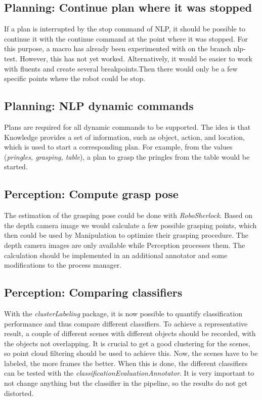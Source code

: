 \documentclass[main.tex]{subfiles}
\begin{document}
		\vspace{0.4cm}
		
		\subsection{Planning: Continue plan where it was stopped}
		If a plan is interrupted by the stop command of NLP, it should be possible to continue it with the continue command at the point where it was stopped. For this purpose, a macro has already been experimented with on the branch nlp-test. However, this has not yet worked. Alternatively, it would be easier to work with fluents and create several breakpoints.Then there would only be a few specific points where the robot could be stop.
		
		\vspace{0.4cm}
		
		\subsection{Planning: NLP dynamic commands}
		Plans are required for all dynamic commands to be supported. The idea is that Knowledge provides a set of information, such as object, action, and location, which is used to start a corresponding plan. For example, from the values (\textit{pringles, grasping, table}), a plan to grasp the pringles from the table would be started.
		
		\vspace{0.4cm}
		
		\subsection{Perception: Compute grasp pose}
		The estimation of the grasping pose could be done with \textit{RoboSherlock}. Based on the depth camera image we would calculate a few possible grasping points, which then could be used by Manipulation to optimize their grasping procedure. The depth camera images are only available while Perception processes them. The calculation should be implemented in an additional annotator and some modifications to the process manager.
		
		\subsection{Perception: Comparing classifiers}
		With the \textit{clusterLabeling} package, it is now possible to quantify classification performance and thus compare different classifiers. To achieve a 					representative result, a couple of different scenes with different objects should be recorded, with the objects not overlapping. It is crucial to get a
		good clustering for the scenes, so point cloud filtering should be used to achieve this. Now, the scenes have to be labeled, the more frames the better. 
		When this is done, the different classifiers can be tested with the \textit{classificationEvaluationAnnotator}. It is very important to not change anything but 
		the classifier in the pipeline, so the results do not get distorted.
		
\end{document}
